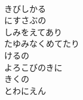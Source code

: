 \documentclass[10pt,b5j]{tarticle} %
\begin{document}
\begin{enumerate}
\begin{minipage}[c]{\blocksize}
    \end{minipage}
    \begin{minipage}[c]{\blocksize}
        
        \vspace{\linespace}
        \item~\\
        きびしかる\\
        にすさぶの\\
        しみをえてあり\\
        たゆみなくめてたり\\
        けるの\\
        よろこびのきに\\
        きくの\\
        とわにえん
    
    \end{minipage}
\end{enumerate} %
\end{document}
